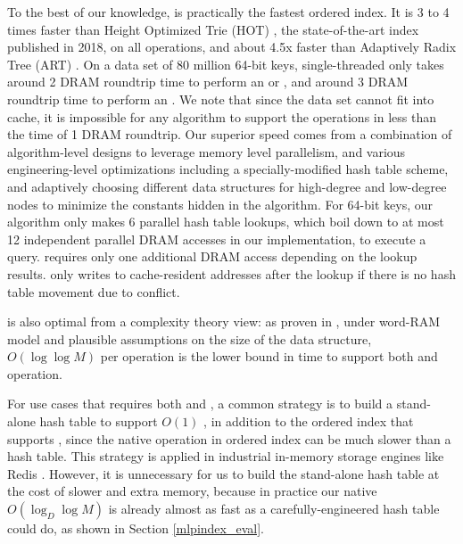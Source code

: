 \documentclass[11pt, usletter]{article}
\begin{document}
To the best of our knowledge, \MlpIndex is practically the fastest ordered index. 
It is 3 to 4 times faster than Height Optimized Trie (HOT) \cite{hot_sigmod18}, 
the state-of-the-art index published in 2018, on all operations,
and about 4.5x faster than Adaptively Radix Tree (ART) \cite{arttrie_icde13}. 
On a data set of 80 million 64-bit keys, single-threaded \MlpIndex only takes around 2 DRAM roundtrip time to perform 
an \insertion or \lookup, and around 3 DRAM roundtrip time to perform an \lowerbound.
We note that since the data set cannot fit into cache, 
it is impossible for any algorithm to support the operations in less than the time of 1 DRAM roundtrip.
Our superior speed 
comes from a combination of algorithm-level designs to leverage memory level parallelism, 
and various engineering-level optimizations including a specially-modified hash table scheme, 
and adaptively choosing different data structures for high-degree and low-degree nodes 
to minimize the constants hidden in the algorithm.
For 64-bit keys, our algorithm only makes 6 parallel hash table lookups, 
which boil down to at most 12 independent parallel DRAM accesses in our implementation,
to execute a \lookup query. \lowerbound requires only one additional DRAM access
depending on the lookup results. 
\insertion only writes to cache-resident addresses after the lookup 
if there is no hash table movement due to conflict.

\MlpIndex is also optimal from a complexity theory view: as proven in \cite{ajtai88comb-lowerbound}, 
under word-RAM model and plausible assumptions on the size of the data structure, 
$O(\log \log M)$ per operation is the lower bound in time to support both \insertion and \lowerbound operation. 

For use cases that requires both \lookup and \lowerbound, 
a common strategy is to build a stand-alone hash table to support $O(1)$ \lookup, 
in addition to the ordered index that supports \lowerbound, 
since the native \lookup operation in ordered index can be much slower than a hash table.
This strategy is applied in industrial in-memory storage engines like Redis \cite{redis}.
However, it is unnecessary for us to build the stand-alone hash table at the cost of slower \insertion and extra memory, 
because in practice our native $O(\log_D\log M)$ \lookup is already almost as fast as a carefully-engineered hash table could do, 
as shown in Section \ref{mlpindex_eval}.
\end{document}
